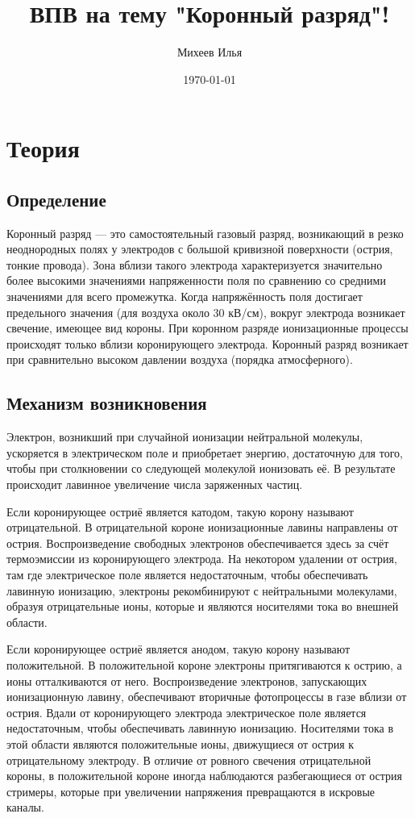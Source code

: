 \documentclass[a4paper, 12pt]{article}
\author{Михеев Илья}
\title{ ВПВ на тему "Коронный разряд"!}
\date{\today}
\begin{document}
	
	\maketitle
	\newpage

\section{Теория}
\subsection{Определение}
Коронный разряд --- это самостоятельный газовый разряд, возникающий в резко неоднородных полях у электродов с большой кривизной поверхности (острия, тонкие провода). Зона вблизи такого электрода характеризуется значительно более высокими значениями напряженности поля по сравнению со средними значениями для всего промежутка. Когда напряжённость поля достигает предельного значения (для воздуха около 30 кВ/см), вокруг электрода возникает свечение, имеющее вид короны. При коронном разряде ионизационные процессы происходят только вблизи коронирующего электрода. Коронный разряд возникает при сравнительно высоком давлении воздуха (порядка атмосферного). 
\subsection{Механизм возникновения}
Электрон, возникший при случайной ионизации нейтральной молекулы, ускоряется в электрическом поле и приобретает энергию, достаточную для того, чтобы при столкновении со следующей молекулой ионизовать её. В результате происходит лавинное увеличение числа заряженных частиц.

Если коронирующее остриё является катодом, такую корону называют отрицательной. В отрицательной короне ионизационные лавины направлены от острия. Воспроизведение свободных электронов обеспечивается здесь за счёт термоэмиссии из коронирующего электрода. На некотором удалении от острия, там где электрическое поле является недостаточным, чтобы обеспечивать лавинную ионизацию, электроны рекомбинируют с нейтральными молекулами, образуя отрицательные ионы, которые и являются носителями тока во внешней области.

Если коронирующее остриё является анодом, такую корону называют положительной. В положительной короне электроны притягиваются к острию, а ионы отталкиваются от него. Воспроизведение электронов, запускающих ионизационную лавину, обеспечивают вторичные фотопроцессы в газе вблизи от острия. Вдали от коронирующего электрода электрическое поле является недостаточным, чтобы обеспечивать лавинную ионизацию. Носителями тока в этой области являются положительные ионы, движущиеся от острия к отрицательному электроду. В отличие от ровного свечения отрицательной короны, в положительной короне иногда наблюдаются разбегающиеся от острия стримеры, которые при увеличении напряжения превращаются в искровые каналы. 
\end{document}
